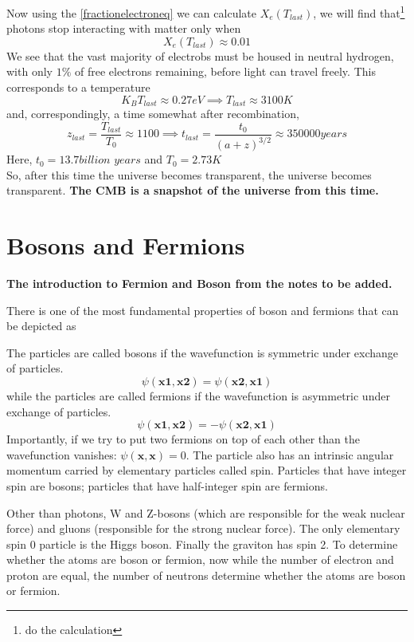 \documentclass[12pt]{report}
\newcommand{\mbf}[1]{\mathbf{#1}}
\newcommand{\tbf}[1]{\textbf{#1}}
\newcommand{\tit}[1]{\textit{#1}}
\newcommand{\fn}[1]{\footnote{#1}}
\begin{document}
Now using the \eqref{fractionelectroneq} we can calculate $X_e(T_{last})$, we will find that\fn{do the calculation} photons stop interacting with matter only when 
\begin{equation}
X_e(T_{last})\approx 0.01
\end{equation}
We see that the vast majority of electrobs must be housed in neutral hydrogen, with only $ 1\% $ of free electrons remaining, before light can travel freely. This corresponds to a temperature 
\begin{equation}
K_{B}T_{last} \approx 0.27 eV \implies T_{last} \approx 3100 K
\end{equation}
and, correspondingly, a time somewhat after recombination,
\begin{equation}
z_{last}=\frac{T_{last}}{T_0} \approx 1100 \implies t_{last}=\frac{t_0}{(a+z)^{3/2}}\approx 350000 years
\end{equation}
Here, $t_0 = 13.7 \tit{billion years}$ and $T_0=2.73 K$\\
So, after this time the universe becomes transparent, the universe becomes transparent. \tbf{The CMB is a snapshot of the universe from this time.}

\section{Bosons and Fermions}
\tbf{The introduction to Fermion and Boson from the notes to be added.}

There is one of the most fundamental properties of boson and fermions that can be depicted as 

The particles are called bosons if the wavefunction is symmetric under exchange of particles.
\begin{equation}
\psi(\mbf{x1,x2})=\psi(\mbf{x2,x1})
\end{equation}
while the particles are called fermions if the wavefunction is asymmetric under exchange of particles.
\begin{equation}
\psi(\mbf{x1,x2})=- \psi(\mbf{x2,x1})
\end{equation}
Importantly, if we try to put two fermions on top of each other than the wavefunction vanishes: $\psi(\mbf{x,x})=0$. The particle also has an intrinsic angular momentum carried by elementary particles called spin. Particles that have integer spin are bosons; particles that have half-integer spin are fermions. 

Other than photons, W and Z-bosons (which are responsible for the weak nuclear force) and gluons (responsible for the strong nuclear force). The only elementary spin 0 particle is the Higgs boson. Finally the graviton has spin 2. To determine whether the atoms are boson or fermion, now while the number of electron and proton are equal, the number of neutrons determine whether the atoms are boson or fermion. 
\end{document}
